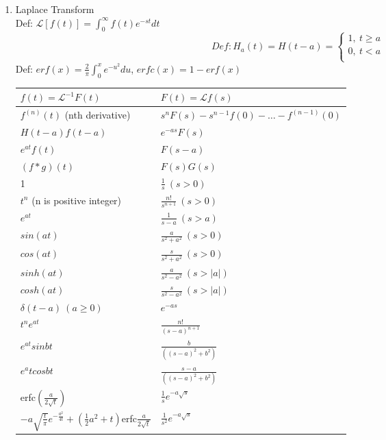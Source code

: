 \documentclass[10pt]{article}
\newcommand{\Lap}{\mathcal{L}}
\begin{document}
\begin{multicols}{2}
\begin{enumerate}
		\item Laplace Transform\\
		Def: $\Lap[f(t)] = \int_{0}^{\infty}f(t)e^{-st}dt$\\
		\begin{equation}
		Def: H_a(t) = H(t-a) = 
		\left\{
		\begin{array}{lr}
			1, \ t \ge a&\\
			0, \ t < a\\
			\end{array}
			\right.
		\end{equation}
		Def: $erf(x) = \frac{2}{\pi} \int_{0}^{x} e^{-u^2}du$, $erfc(x) = 1-erf(x)$
		\begin{center}
			\begin{tabular}{|l l|} \hline
				$f(t) = \Lap^{-1}F (t)$		& $F (t) = \Lap f(s)$ \\ \hline
				$f^{(n)}(t)$ (nth derivative)	& $s^n F(s)-s^{n-1}f(0) - \dots - f^{(n-1)}(0)$  \\
				$H(t-a)f(t-a)$	& $e^{-as}F(s)$ \\
				$e^{at}f(t)$	& $F(s-a)$ \\
				$(f*g)(t)$ 		& $F(s)G(s)$ \\
				1 				& $\frac{1}{s} \ (s > 0)$ \\
				$t^n$ (n is positive integer) & $\frac{n!}{s^{n+1}} \ (s>0) $\\
				$e^{at}$ 			& $ \frac{1}{s-a} \ (s > a)$ \\
				$sin(at)$ 		& $\frac{a}{s^2+a^2} \ (s > 0)$ \\
				$cos(at)$		& $\frac{s}{s^2+a^2} \ (s > 0)$ \\
				$sinh(at)$		& $\frac{a}{s^2-a^2} \ (s > |a|)$ \\
				$cosh(at)$		& $\frac{s}{s^2-a^2} \ (s > |a|)$ \\
				$\delta(t-a) \ (a \ge 0)$ & $e^{-as}$ \\
				$t^ne^{at}$ 	& $\frac{n!}{(s-a)^{n+1}}$ \\
				$e^{at}sinbt$ 	& $\frac{b}{((s-a)^2 + b^2)}$ \\
				$e^atcosbt$		& $\frac{s-a}{((s-a)^2 + b^2)}$ \\
				erfc$(\frac{a}{2 \sqrt{t} })$ & $\frac{1}{s} e^{-a \sqrt{s} }$ \\
				$-a\sqrt{\frac{t}{\pi}}e^{-\frac{a^2}{4t}} + (\frac{1}{2}a^2 + t)$erfc$\frac{a}{2 \sqrt{t} }$ & $\frac{1}{s^2} e^{-a \sqrt{s} }$ \\ \hline
			\end{tabular}

\end{center}
\end{enumerate}
\end{multicols}
\end{document}
